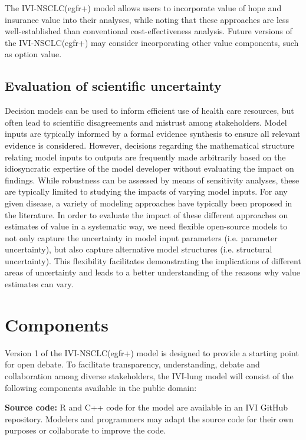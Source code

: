 \documentclass[11pt,final,fleqn]{article}\usepackage[]{graphicx}\usepackage[]{color}
\theoremstyle{plain}
\begin{document}
{The IVI-NSCLC(egfr+) model allows users to incorporate value of hope and insurance value into their analyses, while noting that these approaches are less well-established than conventional cost-effectiveness analysis. Future versions of the IVI-NSCLC(egfr+) may consider incorporating other value components, such as option value.


\subsection{Evaluation of scientific uncertainty}
Decision models can be used to inform efficient use of health care resources, but often lead to scientific disagreements and mistrust among stakeholders. Model inputs are typically informed by a formal evidence synthesis to ensure all relevant evidence is considered. However, decisions regarding the mathematical structure relating model inputs to outputs are frequently made arbitrarily based on the idiosyncratic expertise of the model developer without evaluating the impact on findings. While robustness can be assessed by means of sensitivity analyses, these are typically limited to studying the impacts of varying model inputs. For any given disease, a variety of modeling approaches have typically been proposed in the literature. In order to evaluate the impact of these different approaches on estimates of value in a systematic way, we need flexible open-source models to not only capture the uncertainty in model input parameters (i.e. parameter uncertainty), but also capture alternative model structures (i.e. structural uncertainty). This flexibility facilitates demonstrating the implications of different areas of uncertainty and leads to a better understanding of the reasons why value estimates can vary.

\section{Components}\label{sec:components}

Version 1 of the IVI-NSCLC(egfr+) model is designed to provide a starting point for open debate. To facilitate transparency, understanding, debate and collaboration among diverse stakeholders, the IVI-lung model will consist of the following components available in the public domain:

\textbf{Source code:} R and C++ code for the model are available in an IVI GitHub repository. Modelers and programmers may adapt the source code for their own purposes or collaborate to improve the code.

}
\end{document}
